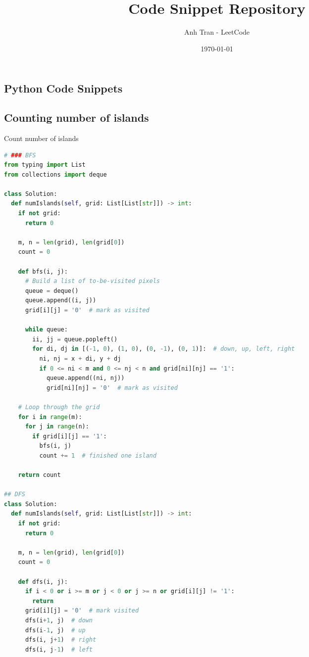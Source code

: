 \documentclass[a4paper,12pt]{article}
\title{Code Snippet Repository}
\author{Anh Tran - LeetCode}
\date{\today}
\begin{document}
\maketitle

\begin{multicols}{2}

\section{Python Code Snippets}

\subsection{Counting number of islands}

\begin{mycode}[label={lst:add-two-numbers}]{Count number of islands}
\begin{lstlisting}[language=Python]
# ### BFS
from typing import List
from collections import deque

class Solution:
  def numIslands(self, grid: List[List[str]]) -> int:
    if not grid:
      return 0

    m, n = len(grid), len(grid[0])
    count = 0

    def bfs(i, j):
      # Build a list of to-be-visited pixels
      queue = deque()
      queue.append((i, j))
      grid[i][j] = '0'  # mark as visited

      while queue:
        ii, jj = queue.popleft()
        for di, dj in [(-1, 0), (1, 0), (0, -1), (0, 1)]:  # down, up, left, right
          ni, nj = x + di, y + dj
          if 0 <= ni < m and 0 <= nj < n and grid[ni][nj] == '1':
            queue.append((ni, nj))
            grid[ni][nj] = '0'  # mark as visited

    # Loop through the grid
    for i in range(m):
      for j in range(n):
        if grid[i][j] == '1':
          bfs(i, j)
          count += 1  # finished one island

    return count

## DFS
class Solution:
  def numIslands(self, grid: List[List[str]]) -> int:
    if not grid:
      return 0

    m, n = len(grid), len(grid[0])
    count = 0

    def dfs(i, j):
      if i < 0 or i >= m or j < 0 or j >= n or grid[i][j] != '1':
        return
      grid[i][j] = '0'  # mark visited
      dfs(i+1, j)  # down
      dfs(i-1, j)  # up
      dfs(i, j+1)  # right
      dfs(i, j-1)  # left


\end{lstlisting}
\end{mycode}
\end{multicols}
\end{document}
